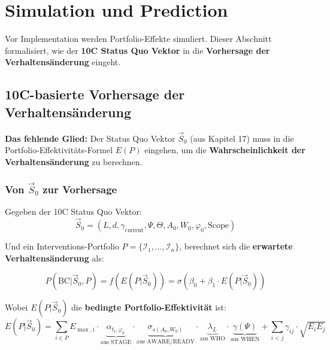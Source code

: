 \section{Simulation und Prediction}
\label{sec:20-simulation}

Vor Implementation werden Portfolio-Effekte simuliert. Dieser Abschnitt formalisiert, wie der \textbf{10C Status Quo Vektor} in die \textbf{Vorhersage der Verhaltensänderung} eingeht.

\subsection{10C-basierte Vorhersage der Verhaltensänderung}
\label{sec:20-9c-prediction}

\begin{tcolorbox}[colback=blue!5!white, colframe=blue!75!black,
    title=\textbf{KRITISCH: Die 10C → Prediction Pipeline}]

\textbf{Das fehlende Glied:} Der Status Quo Vektor $\vec{S}_0$ (aus Kapitel 17) muss in die Portfolio-Effektivitäts-Formel $E(P)$ eingehen, um die \textbf{Wahrscheinlichkeit der Verhaltensänderung} zu berechnen.

\end{tcolorbox}

\subsubsection{Von $\vec{S}_0$ zur Vorhersage}

Gegeben der 10C Status Quo Vektor:
\begin{equation}
\vec{S}_0 = (L, d, \gamma_{\text{current}}, \Psi, \Theta, A_0, W_0, \varphi_0, \text{Scope})
\end{equation}

Und ein Interventions-Portfolio $P = \{\mathcal{I}_1, ..., \mathcal{I}_n\}$, berechnet sich die \textbf{erwartete Verhaltensänderung} als:

\begin{tcolorbox}[colback=green!5!white, colframe=green!75!black,
    title=\textbf{Definition: 10C-basierte Verhaltensänderungs-Vorhersage}]
\begin{equation}
\boxed{P(\text{BC} | \vec{S}_0, P) = f\left( E(P | \vec{S}_0) \right) = \sigma\left( \beta_0 + \beta_1 \cdot E(P | \vec{S}_0) \right)}
\label{eq:20-bc-prediction}
\end{equation}

Wobei $E(P | \vec{S}_0)$ die \textbf{bedingte Portfolio-Effektivität} ist:
\begin{equation}
\boxed{E(P | \vec{S}_0) = \sum_{i \in P} E_{\max,i} \cdot \underbrace{\alpha_{t_i,\varphi_0}}_{\text{aus STAGE}} \cdot \underbrace{\sigma_{s(A_0, W_0)}}_{\text{aus AWARE/READY}} \cdot \underbrace{\lambda_L}_{\text{aus WHO}} \cdot \underbrace{\gamma(\Psi)}_{\text{aus WHEN}} + \sum_{i<j} \gamma_{ij} \cdot \sqrt{E_i E_j}}
\label{eq:20-e-conditional}
\end{equation}
\end{tcolorbox}

